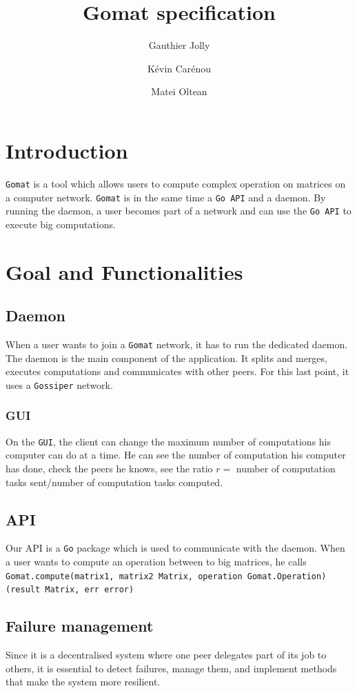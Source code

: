 \documentclass[a4paper,12pt]{article}
\title{Gomat specification}
\author{Gauthier Jolly \and K\'{e}vin Car\'{e}nou \and Matei Oltean}
\newcommand{\Gossiper}{\texttt{Gossiper}\xspace}
\newcommand{\Gomat}{\texttt{Gomat}\xspace}
\newcommand{\Go}{\texttt{Go}\xspace}
\begin{document}
\maketitle
\tableofcontents
\newpage
    \section{Introduction}
    \Gomat is a tool which allows users to compute complex operation on matrices on a computer network.
    \Gomat is in the same time a \texttt{Go API} and a daemon. By running the daemon, a user becomes part of a network and can use the \texttt{Go API} to execute big computations.

    \section{Goal and Functionalities}
        \subsection{Daemon}
    When a user wants to join a \Gomat network, it has to run the dedicated daemon. The daemon is the main component of the application. It splits and merges, executes computations and communicates with other peers. For this last point, it uses a \Gossiper network.

        \subsubsection{GUI}
    On the \texttt{GUI}, the client can change the maximum number of computations his computer can do at a time. He can see the number of computation his computer has done, check the peers he knows, see the ratio $r =$ number of computation tasks sent/{number of computation tasks computed}.

        \subsection{API}
        Our API is a \Go package which is used to communicate with the daemon. When a user wants to compute an operation between to big matrices, he calls\\
    \texttt{Gomat.compute(matrix1, matrix2 Matrix, operation Gomat.Operation) (result Matrix, err error)}

        \subsection{Failure management}
    Since it is a decentralised system where one peer delegates part of its job to others, it is essential to detect failures, manage them, and implement methods that make the system more resilient.
\end{document}

